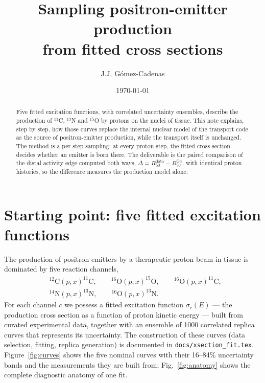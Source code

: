 \documentclass[11pt]{article}
\title{Sampling positron-emitter production\\from fitted cross sections}
\author{J.J. G\'omez-Cadenas}
\date{\today}
\newcommand{\file}[1]{\texttt{#1}}
\begin{document}
\maketitle

\begin{abstract}
Five fitted excitation functions, with correlated uncertainty ensembles,
describe the production of $^{11}$C, $^{13}$N and $^{15}$O by protons on the
nuclei of tissue.  This note explains, step by step, how those curves replace
the internal nuclear model of the transport code as the source of
positron-emitter production, while the transport itself is unchanged.  The
method is a per-step sampling: at every proton step, the fitted cross section
decides whether an emitter is born there.  The deliverable is the paired
comparison of the distal activity edge computed both ways,
$\Delta = R_{50}^{\mathrm{data}} - R_{50}^{\mathrm{G4}}$, with identical
proton histories, so the difference measures the production model alone.
\end{abstract}

\section{Starting point: five fitted excitation functions}

The production of positron emitters by a therapeutic proton beam in tissue is
dominated by five reaction channels,
\begin{equation}
\begin{split}
  &^{12}\mathrm{C}(p,x)^{11}\mathrm{C},\qquad
   ^{16}\mathrm{O}(p,x)^{15}\mathrm{O},\qquad
   ^{16}\mathrm{O}(p,x)^{11}\mathrm{C},\\
  &^{14}\mathrm{N}(p,x)^{13}\mathrm{N},\qquad
   ^{16}\mathrm{O}(p,x)^{13}\mathrm{N}.
\end{split}
\label{eq:channels}
\end{equation}
For each channel $c$ we possess a fitted excitation function
$\sigma_c(E)$ --- the production cross section as a function of proton kinetic
energy --- built from curated experimental data, together with an ensemble of
1000 correlated replica curves that represents its uncertainty.  The
construction of these curves (data selection, fitting, replica generation) is
documented in \file{docs/xsection\_fit.tex}.  Figure~\ref{fig:curves} shows
the five nominal curves with their 16--84\% uncertainty bands and the
measurements they are built from; Fig.~\ref{fig:anatomy} shows the complete
diagnostic anatomy of one fit.
\end{document}
